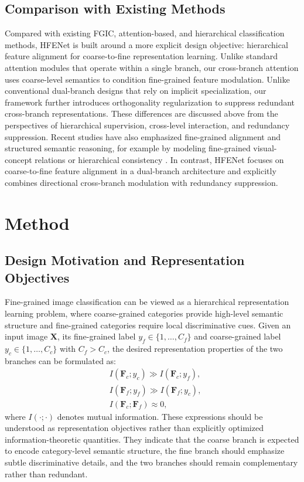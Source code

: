 \documentclass[pdflatex,sn-mathphys-num]{sn-jnl}
\theoremstyle{thmstyleone}%
\theoremstyle{thmstyletwo}%
\theoremstyle{thmstylethree}%
\begin{document}
\subsection{Comparison with Existing Methods}
Compared with existing FGIC, attention-based, and hierarchical classification methods, HFENet is built around a more explicit design objective: hierarchical feature alignment for coarse-to-fine representation learning. 
Unlike standard attention modules that operate within a single branch, our cross-branch attention uses coarse-level semantics to condition fine-grained feature modulation. 
Unlike conventional dual-branch designs that rely on implicit specialization, our framework further introduces orthogonality regularization to suppress redundant cross-branch representations. 
These differences are discussed above from the perspectives of hierarchical supervision, cross-level interaction, and redundancy suppression.
Recent studies have also emphasized fine-grained alignment and structured semantic reasoning, for example by modeling fine-grained visual-concept relations or hierarchical consistency \cite{xie2025dotcbm,gao2025chbc}. 
In contrast, HFENet focuses on coarse-to-fine feature alignment in a dual-branch architecture and explicitly combines directional cross-branch modulation with redundancy suppression.

\section{Method}
\label{sec:method}


\subsection{Design Motivation and Representation Objectives}

Fine-grained image classification can be viewed as a hierarchical representation learning problem, where coarse-grained categories provide high-level semantic structure and fine-grained categories require local discriminative cues. Given an input image $\mathbf{X}$, its fine-grained label $y_f \in \{1,\dots,C_f\}$ and coarse-grained label $y_c \in \{1,\dots,C_c\}$ with $C_f > C_c$, the desired representation properties of the two branches can be formulated as:
\begin{equation}
\begin{aligned}
&I(\mathbf{F}_c; y_c) \gg I(\mathbf{F}_c; y_f), \\
&I(\mathbf{F}_f; y_f) \gg I(\mathbf{F}_f; y_c), \\
&I(\mathbf{F}_c; \mathbf{F}_f) \approx 0,
\end{aligned}
\label{eq:information_constraints}
\end{equation}
where $I(\cdot;\cdot)$ denotes mutual information. These expressions should be understood as representation objectives rather than explicitly optimized information-theoretic quantities. They indicate that the coarse branch is expected to encode category-level semantic structure, the fine branch should emphasize subtle discriminative details, and the two branches should remain complementary rather than redundant.
\end{document}
